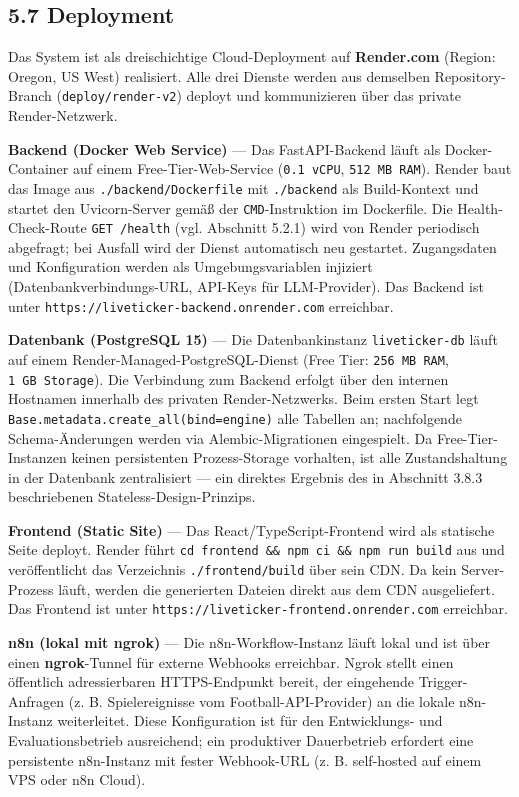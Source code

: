 \subsection{5.7 Deployment}\label{deployment}

Das System ist als dreischichtige Cloud-Deployment auf
\textbf{Render.com} (Region: Oregon, US West) realisiert. Alle drei
Dienste werden aus demselben Repository-Branch
(\texttt{deploy/render-v2}) deployt und kommunizieren über das private
Render-Netzwerk.

\textbf{Backend (Docker Web Service)} --- Das FastAPI-Backend läuft als
Docker-Container auf einem Free-Tier-Web-Service (\texttt{0.1\ vCPU},
\texttt{512\ MB\ RAM}). Render baut das Image aus
\texttt{./backend/Dockerfile} mit \texttt{./backend} als Build-Kontext
und startet den Uvicorn-Server gemäß der \texttt{CMD}-Instruktion im
Dockerfile. Die Health-Check-Route \texttt{GET\ /health} (vgl. Abschnitt
5.2.1) wird von Render periodisch abgefragt; bei Ausfall wird der Dienst
automatisch neu gestartet. Zugangsdaten und Konfiguration werden als
Umgebungsvariablen injiziert (Datenbankverbindungs-URL, API-Keys für
LLM-Provider). Das Backend ist unter
\texttt{https://liveticker-backend.onrender.com} erreichbar.

\textbf{Datenbank (PostgreSQL 15)} --- Die Datenbankinstanz
\texttt{liveticker-db} läuft auf einem Render-Managed-PostgreSQL-Dienst
(Free Tier: \texttt{256\ MB\ RAM}, \texttt{1\ GB\ Storage}). Die
Verbindung zum Backend erfolgt über den internen Hostnamen innerhalb des
privaten Render-Netzwerks. Beim ersten Start legt
\texttt{Base.metadata.create\_all(bind=engine)} alle Tabellen an;
nachfolgende Schema-Änderungen werden via Alembic-Migrationen
eingespielt. Da Free-Tier-Instanzen keinen persistenten Prozess-Storage
vorhalten, ist alle Zustandshaltung in der Datenbank zentralisiert ---
ein direktes Ergebnis des in Abschnitt 3.8.3 beschriebenen
Stateless-Design-Prinzips.

\textbf{Frontend (Static Site)} --- Das React/TypeScript-Frontend wird
als statische Seite deployt. Render führt
\texttt{cd\ frontend\ \&\&\ npm\ ci\ \&\&\ npm\ run\ build} aus und
veröffentlicht das Verzeichnis \texttt{./frontend/build} über sein CDN.
Da kein Server-Prozess läuft, werden die generierten Dateien direkt aus
dem CDN ausgeliefert. Das Frontend ist unter
\texttt{https://liveticker-frontend.onrender.com} erreichbar.

\textbf{n8n (lokal mit ngrok)} --- Die n8n-Workflow-Instanz läuft lokal
und ist über einen \textbf{ngrok}-Tunnel für externe Webhooks
erreichbar. Ngrok stellt einen öffentlich adressierbaren HTTPS-Endpunkt
bereit, der eingehende Trigger-Anfragen (z. B. Spielereignisse vom
Football-API-Provider) an die lokale n8n-Instanz weiterleitet. Diese
Konfiguration ist für den Entwicklungs- und Evaluationsbetrieb
ausreichend; ein produktiver Dauerbetrieb erfordert eine persistente
n8n-Instanz mit fester Webhook-URL (z. B. self-hosted auf einem VPS oder
n8n Cloud).

